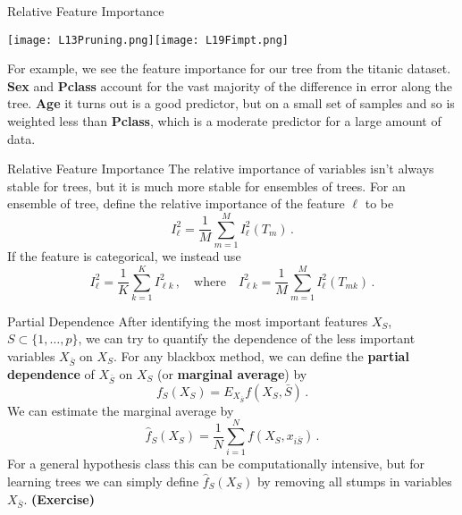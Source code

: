 \documentclass[10pt, table, dvipsnames,xcdraw, handout]{beamer}
\begin{document}
 \begin{frame}[fragile]{Relative Feature Importance}
   \begin{minipage}[t][0.5\textheight][t]{\textwidth}
	\centering \texttt{[image: L13Pruning.png]}\hspace{1em}\texttt{[image: L19Fimpt.png]} 
  \end{minipage}
  \vfill
\begin{minipage}[t][0.5\textheight][t]{\textwidth}
For example, we see the feature importance for our tree from the titanic dataset. \textbf{Sex} and \textbf{Pclass} account for the vast majority of the difference in error along the tree. \pause \textbf{Age} it turns out is a good predictor, but on a small set of samples and so is weighted less than \textbf{Pclass}, which is a moderate predictor for a large amount of data. 
\end{minipage}
\end{frame}





 \begin{frame}[fragile]{Relative Feature Importance}
The relative importance of variables isn't always stable for trees, but it is much more stable for ensembles of trees. For an ensemble of tree, define the relative importance of the feature $\ell$ to be
$$
I^2_\ell = \frac1{M}\sum_{m=1}^M I^2_\ell(T_m)\,.
$$
If the feature is categorical, we instead use
$$
I^2_\ell = \frac{1}{K}\sum_{k=1}^KI^2_{\ell k} \,, \hspace{1em}\text{where}
\hspace{1em}
I^2_{\ell k} = \frac1{M}\sum_{m=1}^M I^2_\ell(T_{mk})\,.
$$
\end{frame}




\begin{frame}[fragile]{Partial Dependence}
After identifying the most important features $X_S$, $S\subset \{1,\ldots, p\}$, we can try to quantify the dependence of the less important variables $X_{\bar S}$ on $X_S$. \pause For any blackbox method, we can define the \textbf{partial dependence} of $X_{\bar S}$ on $X_S$ (or \textbf{marginal average}) by 
$$
f_S(X_S) = E_{X_{\bar S}}f(X_S,{\bar S})\,.
$$\pause 
We can estimate the marginal average by
$$
\hat{f}_S(X_S) = \frac{1}{N} \sum_{i=1}^N f(X_S,x_{i{\bar S}})\,.
$$\pause
For a general hypothesis class this can be computationally intensive, but for learning trees we can simply define $\hat{f}_S(X_S) $ by removing all stumps in variables $X_{\bar S}$. \textbf{(Exercise)}
\end{frame}
\end{document}
